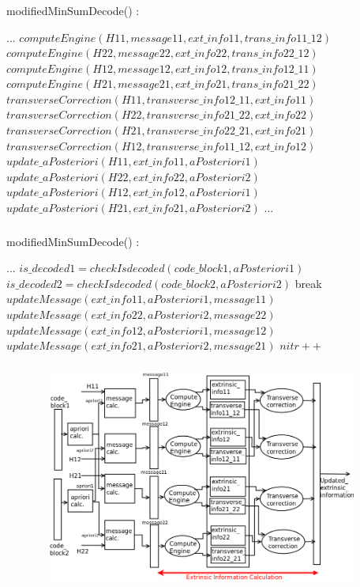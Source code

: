\documentclass[xcolor=dvipsname]
{beamer}
\begin{document}
\begin{frame}[t]
\frametitle{  }                                 %
\alert{ modifiedMinSumDecode()	: }
\begin{algorithmic}   
\STATE ...               
\STATE$computeEngine(H11,message11,ext\_info11,trans\_info11\_12)$
\STATE$computeEngine(H22,message22,ext\_info22,trans\_info22\_12)$
\STATE$computeEngine(H12,message12,ext\_info12,trans\_info12\_11)$
\STATE$computeEngine(H21,message21,ext\_info21,trans\_info21\_22)$
\STATE$transverseCorrection(H11,transverse\_info12\_11,ext\_info11)$
\STATE$transverseCorrection(H22,transverse\_info21\_22,ext\_info22)$
\STATE$transverseCorrection(H21,transverse\_info22\_21,ext\_info21)$
\STATE$transverseCorrection(H12,transverse\_info11\_12,ext\_info12)$
\STATE$update\_aPosteriori (H11 , ext\_info11 ,aPosteriori1)$
\STATE$update\_aPosteriori (H22 , ext\_info22 ,aPosteriori2)$
\STATE$update\_aPosteriori (H12 , ext\_info12 ,aPosteriori1)$
\STATE$update\_aPosteriori (H21 , ext\_info21 ,aPosteriori2)$
\STATE ...
     	
 \ENDWHILE    


  		
\end{algorithmic}
\end{frame}


\begin{frame}[t]
\frametitle{  }                                 %
\alert{ modifiedMinSumDecode()	: }
\begin{algorithmic}   
\STATE ...  
\STATE$is\_decoded1 = checkIsdecoded( code\_block1 , aPosteriori1 ) $
\STATE$is\_decoded2 = checkIsdecoded( code\_block2 , aPosteriori2 ) $              
        	\STATE break 
    	\ELSE
        	\STATE $updateMessage(ext\_info11 ,aPosteriori1 ,message11)$
        	\STATE $updateMessage(ext\_info22 ,aPosteriori2 ,message22)$
        	\STATE $updateMessage(ext\_info12 ,aPosteriori1 ,message12)$
        	\STATE $updateMessage(ext\_info21 ,aPosteriori2 ,message21)$
     	\ENDIF 
\STATE $nitr++$  
 \ENDWHILE    


  		
\end{algorithmic}
\end{frame}

\begin{frame}[t]
\frametitle{  }  
\begin{figure}
       \includegraphics[height=7cm,width=11cm]{minSumModified}
       \end{figure}
\end{frame}
\end{document}

